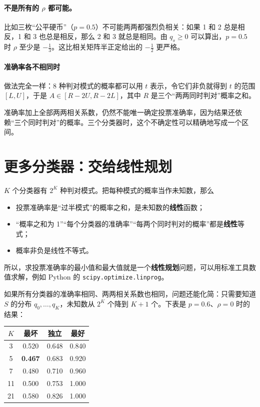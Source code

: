 \documentclass[11pt]{article}
\begin{document}
\paragraph{不是所有的 $\rho$ 都可能。}比如三枚“公平硬币”（$p=0.5$）不可能两两都强烈负相关：如果 1 和 2 总是相反，1 和 3 也总是相反，那么 2 和 3 就总是相同。由 $q_s\ge0$ 可以算出，$p=0.5$ 时 $\rho$ 至少是 $-\frac13$。这比相关矩阵半正定给出的 $-\frac12$ 更严格。

\paragraph{准确率各不相同时}做法完全一样：8 种判对模式的概率都可以用 $t$ 表示，令它们非负就得到 $t$ 的范围 $[L,U]$，于是 $A\in[R-2U,R-2L]$，其中 $R$ 是三个“两两同时判对”概率之和。

\begin{keybox}[title=要点]
准确率加上全部两两相关系数，仍然不能唯一确定投票准确率，因为结果还依赖“三个同时判对”的概率。三个分类器时，这个不确定性可以精确地写成一个区间。
\end{keybox}

\section{更多分类器：交给线性规划}

$K$ 个分类器有 $2^K$ 种判对模式。把每种模式的概率当作未知数，那么
\begin{itemize}
\item 投票准确率是“过半模式”的概率之和，是未知数的\textbf{线性}函数；
\item “概率之和为 1”“每个分类器的准确率”“每两个同时判对的概率”都是\textbf{线性}等式；
\item 概率非负是线性不等式。
\end{itemize}
所以，求投票准确率的最小值和最大值就是一个\hspace{0pt}\textbf{线性规划}\hspace{0pt}问题，可以用标准工具数值求解，例如 Python 的
\texttt{scipy.optimize.linprog}。

如果所有分类器的准确率相同、两两相关系数也相同，问题还能化简：只需要知道 $S$ 的分布 $q_0,\dots,q_K$，未知数从 $2^K$ 个降到 $K+1$ 个。下表是 $p=0.6$、$\rho=0$ 时的结果：

\begin{center}
\small
\begin{tabular}{cccc}
\toprule
$K$ & 最坏 & 独立 & 最好\\
\midrule
3 & 0.520 & 0.648 & 0.840\\
5 & \textbf{0.467} & 0.683 & 0.920\\
7 & 0.480 & 0.710 & 0.960\\
11 & 0.500 & 0.753 & 1.000\\
21 & 0.580 & 0.826 & 1.000\\
\bottomrule
\end{tabular}
\end{center}
\end{document}
